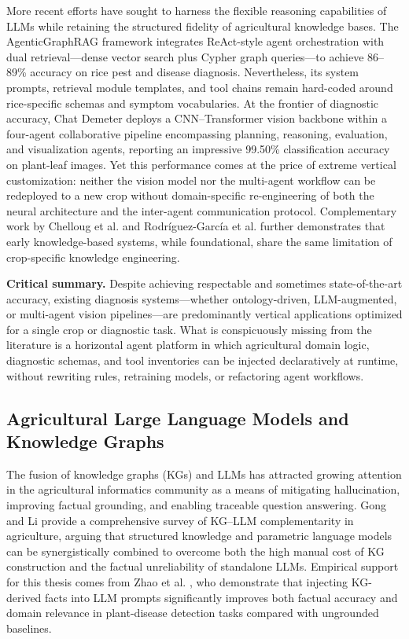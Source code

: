 \documentclass[11pt,a4paper]{article}
\begin{document}
More recent efforts have sought to harness the flexible reasoning capabilities of LLMs while retaining the structured fidelity of agricultural knowledge bases. The AgenticGraphRAG framework \cite{agenticgraphrag2025} integrates ReAct-style agent orchestration with dual retrieval---dense vector search plus Cypher graph queries---to achieve 86--89\% accuracy on rice pest and disease diagnosis. Nevertheless, its system prompts, retrieval module templates, and tool chains remain hard-coded around rice-specific schemas and symptom vocabularies. At the frontier of diagnostic accuracy, Chat Demeter \cite{chatdemeter2025} deploys a CNN--Transformer vision backbone within a four-agent collaborative pipeline encompassing planning, reasoning, evaluation, and visualization agents, reporting an impressive 99.50\% classification accuracy on plant-leaf images. Yet this performance comes at the price of extreme vertical customization: neither the vision model nor the multi-agent workflow can be redeployed to a new crop without domain-specific re-engineering of both the neural architecture and the inter-agent communication protocol. Complementary work by Chelloug et al. \cite{chelloug2023mdtwlstm} and Rodr{\'i}guez-Garc{\'i}a et al. \cite{rodriguez2021kbs} further demonstrates that early knowledge-based systems, while foundational, share the same limitation of crop-specific knowledge engineering.

\textbf{Critical summary.} Despite achieving respectable and sometimes state-of-the-art accuracy, existing diagnosis systems---whether ontology-driven, LLM-augmented, or multi-agent vision pipelines---are predominantly vertical applications optimized for a single crop or diagnostic task. What is conspicuously missing from the literature is a horizontal agent platform in which agricultural domain logic, diagnostic schemas, and tool inventories can be injected declaratively at runtime, without rewriting rules, retraining models, or refactoring agent workflows.

\subsection{Agricultural Large Language Models and Knowledge Graphs}

The fusion of knowledge graphs (KGs) and LLMs has attracted growing attention in the agricultural informatics community as a means of mitigating hallucination, improving factual grounding, and enabling traceable question answering. Gong and Li \cite{gong2025kgllm} provide a comprehensive survey of KG--LLM complementarity in agriculture, arguing that structured knowledge and parametric language models can be synergistically combined to overcome both the high manual cost of KG construction and the factual unreliability of standalone LLMs. Empirical support for this thesis comes from Zhao et al. \cite{zhao2024llmkgagriculture}, who demonstrate that injecting KG-derived facts into LLM prompts significantly improves both factual accuracy and domain relevance in plant-disease detection tasks compared with ungrounded baselines.
\end{document}
